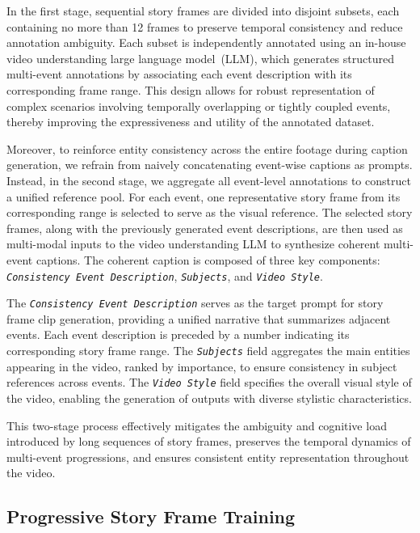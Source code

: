 In the first stage, sequential story frames are divided into disjoint subsets, each containing no more than 12 frames to preserve temporal consistency and reduce annotation ambiguity. Each subset is independently annotated using an in-house video understanding large language model~(LLM), which generates structured multi-event annotations by associating each event description with its corresponding frame range. 
This design allows for robust representation of complex scenarios involving temporally overlapping or tightly coupled events, thereby improving the expressiveness and utility of the annotated dataset.

Moreover, to reinforce entity consistency across the entire footage during caption generation, we refrain from naively concatenating event-wise captions as prompts. 
Instead, in the second stage, we aggregate all event-level annotations to construct a unified reference pool. 
For each event, one representative story frame from its corresponding range is selected to serve as the visual reference.
The selected story frames, along with the previously generated event descriptions, are then used as multi-modal inputs to the video understanding LLM to synthesize coherent multi-event captions.
The coherent caption is composed of three key components: \textit{\texttt{Consistency Event Description}}, \textit{\texttt{Subjects}}, and \textit{\texttt{Video Style}}.

The \textit{\texttt{Consistency Event Description}} serves as the target prompt for story frame clip generation, providing a unified narrative that summarizes adjacent events. Each event description is preceded by a number indicating its corresponding story frame range. The \textit{\texttt{Subjects}} field aggregates the main entities appearing in the video, ranked by importance, to ensure consistency in subject references across events. The \textit{\texttt{Video Style}} field specifies the overall visual style of the video, enabling the generation of outputs with diverse stylistic characteristics.

This two-stage process effectively mitigates the ambiguity and cognitive load introduced by long sequences of story frames, preserves the temporal dynamics of multi-event progressions, and ensures consistent entity representation throughout the video.



\subsection{Progressive Story Frame Training}

